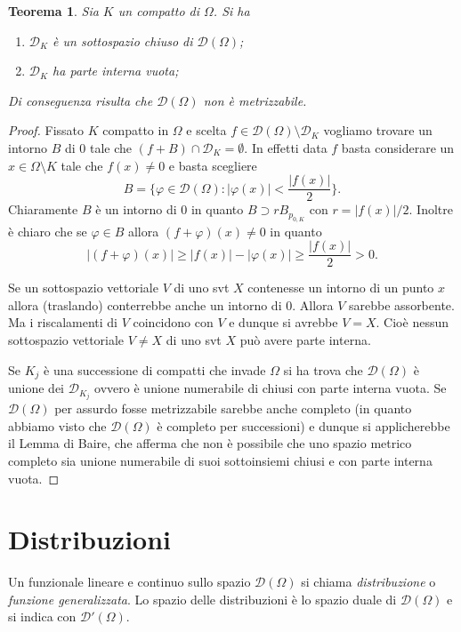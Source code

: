 \documentclass[italian,a4paper,oneside,headinclude]{scrbook}
\renewcommand{\phi}{\varphi}
\newcommand{\D}{\mathcal D}
\newcommand{\abs}[1]{{\left|#1\right|}}
\newtheorem{theorem}{Teorema}
\begin{document}
\begin{theorem}
  Sia $K$ un compatto di $\Omega$. Si ha
  \begin{enumerate}
  \item $\D_K$ è un sottospazio chiuso di $\D(\Omega)$;
  \item $\D_K$ ha parte interna vuota;
    \end{enumerate}
  Di conseguenza risulta che $\D(\Omega)$ non è metrizzabile.
\end{theorem}
%
\begin{proof}
  Fissato $K$ compatto in $\Omega$ e scelta
  $f \in \D(\Omega) \setminus \D_K$
  vogliamo trovare un intorno $B$ di $0$ tale che $(f+B) \cap \D_K = \emptyset$.
  In effetti data $f$ basta considerare un $x\in \Omega\setminus K$ tale
  che $f(x)\neq 0$ e basta scegliere
  \[
  B = \{\phi \in \D(\Omega)\colon \abs{\phi(x)} < \frac{\abs{f(x)}}{2}\}.
  \]
  Chiaramente $B$ è un intorno di $0$ in quanto
  $B\supset r B_{p_{0,K}}$ con $r=\abs{f(x)}/2$. Inoltre è chiaro che
  se $\phi\in B$ allora $(f+\phi)(x)\neq 0$ in quanto
  \[
   \abs{(f+\phi)(x)} \ge \abs{f(x)}-\abs{\phi(x)} \ge
   \frac{\abs{f(x)}}{2} > 0.
  \]

  Se un sottospazio vettoriale $V$ di uno svt $X$ contenesse un
  intorno di un punto $x$ allora (traslando) conterrebbe anche un intorno
  di $0$. Allora $V$ sarebbe assorbente.
  Ma i
  riscalamenti di $V$ coincidono con $V$ e dunque si avrebbe
  $V=X$. Cioè nessun sottospazio vettoriale $V\neq X$ di uno svt $X$
  può avere parte interna.

  Se $K_j$ è una successione di compatti che invade $\Omega$ si ha
  trova che $\D(\Omega)$ è unione dei $\D_{K_j}$ ovvero è unione
  numerabile di chiusi con parte interna vuota.
  Se $\D(\Omega)$
  per assurdo
  fosse metrizzabile sarebbe anche completo (in quanto abbiamo visto
  che $\D(\Omega)$ è completo per successioni) e dunque
  si applicherebbe il Lemma di Baire, che afferma che non è
  possibile che uno spazio metrico completo sia unione numerabile di
  suoi sottoinsiemi chiusi e con parte interna vuota.
\end{proof}

\chapter{Distribuzioni}

Un funzionale lineare e continuo sullo spazio $\D(\Omega)$ si chiama
\emph{distribuzione}
o \emph{funzione generalizzata}.
Lo spazio delle distribuzioni è lo spazio duale di $\D(\Omega)$ e si
indica con $\D'(\Omega)$.
\end{document}
